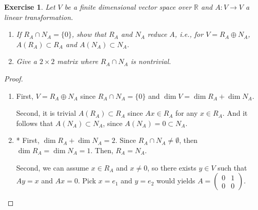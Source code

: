 \documentclass[11pt]{book}
\newtheorem{exercise}{Exercise}[section]
\theoremstyle{definition}
\numberwithin{equation}{chapter}
\begin{document}
\begin{exercise}
Let $V$ be a finite dimensional vector space over $\mathbb{R}$ and $A: V \to V$ a linear transformation.
\begin{enumerate}[label=(\alph*)]
    \item If $R_A \cap N_A = \{0\}$, show that $R_A$ and $N_A$ reduce $A$, i.e., for $V = R_A \oplus N_A$, $A(R_A) \subset R_A$ and $A(N_A) \subset N_A$.
    
    \item Give a $2 \times 2$ matrix where $R_A \cap N_A$ is nontrivial.
\end{enumerate}
\end{exercise}
\begin{proof}
~\begin{enumerate}[label=(\alph*)]
    \item First, $V = R_A \oplus N_A$ since $R_A \cap N_A = \{0\}$ and $\dim  V = \dim  R_A + \dim  N_A$.
    
    Second, it is trivial $A(R_A) \subset R_A$ since $Ax \in R_A$ for any $x \in R_A$. And it follows that $A(N_A) \subset N_A$, since $A(N_A) = 0 \subset N_A$.
    
    \item* First, $\dim  R_A + \dim  N_A = 2$. Since $R_A \cap N_A \neq \emptyset$, then $\dim  R_A = \dim  N_A = 1$. Then, $R_A = N_A$.
    
    Second, we can assume $x \in R_A$ and $x \neq 0$, so there exists $y \in V$ such that $Ay = x$ and $Ax = 0$. Pick $x = e_1$ and $y = e_2$ would yields $A = \begin{pmatrix} 0 & 1 \\ 0 & 0 \end{pmatrix}$.
\end{enumerate}
\end{proof}

\medskip
\end{document}
